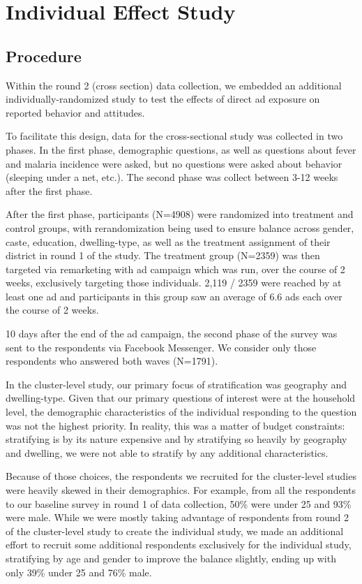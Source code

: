 \documentclass[a4paper,12pt]{article}
\begin{document}



\section{Individual Effect Study} \label{individual-effect}


\subsection{Procedure}

Within the round 2 (cross section) data collection, we embedded an additional individually-randomized study to test the effects of direct ad exposure on reported behavior and attitudes.

To facilitate this design, data for the cross-sectional study was collected in two phases. In the first phase, demographic questions, as well as questions about fever and malaria incidence were asked, but no questions were asked about behavior (sleeping under a net, etc.). The second phase was collect between 3-12 weeks after the first phase.

After the first phase, participants (N=4908) were randomized into treatment and control groups, with rerandomization being used to ensure balance across gender, caste, education, dwelling-type, as well as the treatment assignment of their district in round 1 of the study. The treatment group (N=2359) was then targeted via remarketing with ad campaign which was run, over the course of 2 weeks, exclusively targeting those individuals. 2,119 / 2359 were reached by at least one ad and participants in this group saw an average of 6.6 ads each over the course of 2 weeks.

10 days after the end of the ad campaign, the second phase of the survey was sent to the respondents via Facebook Messenger. We consider only those respondents who answered both waves (N=1791).

In the cluster-level study, our primary focus of stratification was geography and dwelling-type. Given that our primary questions of interest were at the household level, the demographic characteristics of the individual responding to the question was not the highest priority. In reality, this was a matter of budget constraints: stratifying is by its nature expensive and by stratifying so heavily by geography and dwelling, we were not able to stratify by any additional characteristics.

Because of those choices, the respondents we recruited for the cluster-level studies were heavily skewed in their demographics. For example, from all the respondents to our baseline survey in round 1 of data collection, 50\% were under 25 and 93\% were male. While we were mostly taking advantage of respondents from round 2 of the cluster-level study to create the individual study, we made an additional effort to recruit some additional respondents exclusively for the individual study, stratifying by age and gender to improve the balance slightly, ending up with only 39\% under 25 and 76\% male.
\end{document}
